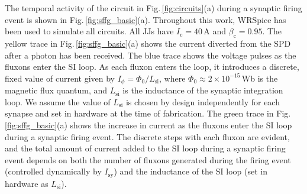 \documentclass[twocolumn]{article}
\begin{document}
\begin{figure}[tb]
\end{figure}
The temporal activity of the circuit in Fig.\,\ref{fig:circuits}(a) during a synaptic firing event is shown in Fig.\,\ref{fig:sffg_basic}(a). Throughout this work, WRSpice \cite{wh1991} has been used to simulate all circuits. All JJs have $I_{\mathrm{c}} = 40$\,\textmu A and $\beta_{\mathrm{c}} = 0.95$. The yellow trace in Fig.\,\ref{fig:sffg_basic}(a) shows the current diverted from the SPD after a photon has been received. The blue trace shows the voltage pulses as the fluxons enter the SI loop. As each fluxon enters the loop, it introduces a discrete, fixed value of current given by $I_{\phi} = \Phi_0/L_{\mathrm{si}}$, where $\Phi_0 \approx 2\times 10^{-15}$\,Wb is the magnetic flux quantum, and $L_{\mathrm{si}}$ is the inductance of the synaptic integration loop. We assume the value of $L_{\mathrm{si}}$ is chosen by design independently for each synapse and set in hardware at the time of fabrication. The green trace in Fig.\,\ref{fig:sffg_basic}(a) shows the increase in current as the fluxons enter the SI loop during a synaptic firing event. The discrete steps with each fluxon are evident, and the total amount of current added to the SI loop during a synaptic firing event depends on both the number of fluxons generated during the firing event (controlled dynamically by $I_{\mathrm{sy}}$) and the inductance of the SI loop (set in hardware as $L_{\mathrm{si}}$). 
\end{document}

